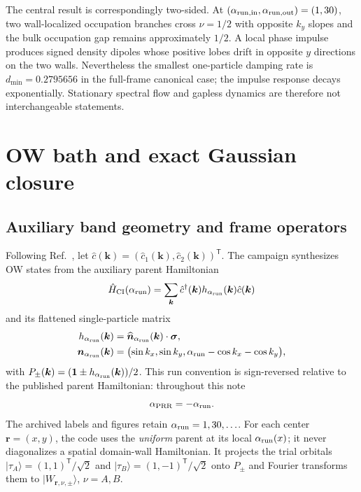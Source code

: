 \documentclass[aps,prb,twocolumn,nofootinbib,superscriptaddress,floatfix]{revtex4-2}
\newcommand{\id}{\mathbf{1}}
\begin{document}
The central result is correspondingly two-sided. At
$(\alpha_{\rm run,in},\alpha_{\rm run,out})=(1,30)$, two wall-localized occupation
branches cross $\nu=1/2$ with opposite $k_y$ slopes and the bulk occupation
gap remains approximately $1/2$. A local phase impulse produces signed density
dipoles whose positive lobes drift in opposite $y$ directions on the two
walls. Nevertheless the smallest one-particle damping rate is
$d_{\min}=0.2795656$ in the full-frame canonical case; the impulse response
decays exponentially. Stationary spectral flow and gapless dynamics are
therefore not interchangeable statements.

\section{OW bath and exact Gaussian closure}

\subsection{Auxiliary band geometry and frame operators}

Following Ref.~\cite{Bhuiyan2026}, let
$\hat c(\boldsymbol k)=(\hat c_1(\boldsymbol k),
\hat c_2(\boldsymbol k))^{\mathsf T}$. The campaign synthesizes OW states
from the auxiliary parent Hamiltonian
\begin{equation}
 \hat H_{\rm CI}(\alpha_{\rm run})=
 \sum_{\boldsymbol k}\hat c^\dagger(\boldsymbol k)
 h_{\alpha_{\rm run}}(\boldsymbol k)\hat c(\boldsymbol k)
\end{equation}
and its flattened single-particle matrix
\begin{align}
 h_{\alpha_{\rm run}}(\boldsymbol k)
 &=\widehat{\boldsymbol n}_{\alpha_{\rm run}}(\boldsymbol k)
 \cdot\boldsymbol\sigma,\nonumber\\
 \boldsymbol n_{\alpha_{\rm run}}(\boldsymbol k)
 &=\bigl(\sin k_x,\sin k_y,
 \alpha_{\rm run}-\cos k_x-\cos k_y\bigr),
 \label{eq:parent}
\end{align}
with $P_\pm(\boldsymbol k)=(\id\pm
h_{\alpha_{\rm run}}(\boldsymbol k))/2$. This run convention is sign-reversed relative to
the published parent Hamiltonian: throughout this note
\begin{equation}
 \alpha_{\rm PRR}=-\alpha_{\rm run}.
 \label{eq:alphamap}
\end{equation}
The archived labels and figures retain $\alpha_{\rm run}=1,30,\ldots$.
For each center $\boldsymbol r=(x,y)$, the code uses the \emph{uniform}
parent at its local $\alpha_{\rm run}(x)$; it never diagonalizes a spatial
domain-wall Hamiltonian. It projects the trial orbitals
$|\tau_A\rangle=(1,1)^{\mathsf T}/\sqrt2$ and
$|\tau_B\rangle=(1,-1)^{\mathsf T}/\sqrt2$ onto $P_\pm$ and Fourier transforms them
to $|W_{\boldsymbol r,\nu,\pm}\rangle$, $\nu=A,B$.
\end{document}
